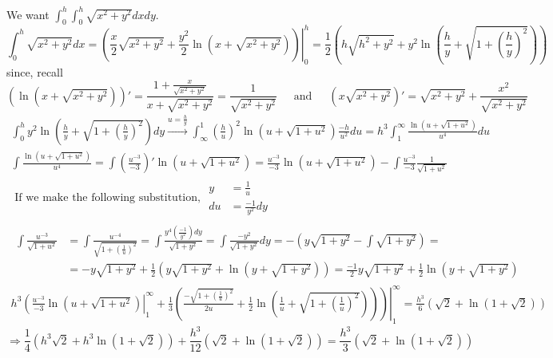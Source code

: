 \documentclass[twoside]{amsart}
\theoremstyle{plain}
\theoremstyle{definition}
\newcommand{\exercisehead}[1]
  {
   \noindent{\small\bf Exercise #1.}
   \smallskip}
\begin{document}
\exercisehead{19}  We want $\int_0^h \int_0^h \sqrt{ x^2 + y^2} dx dy$.  
\[
\int_0^h \sqrt{ x^2 + y^2} dx = \left. \left( \frac{x}{2} \sqrt{ x^2  +y^2} + \frac{y^2}{2} \ln{ (x+ \sqrt{ x^2 +y^2 } )}\right) \right|_0^h = \frac{1}{2} \left( h \sqrt{ h^2 +y^2} + y^2 \ln{( \frac{h}{y} + \sqrt{ 1 + \left( \frac{ h}{y} \right)^2 } )} \right)
\]
since, recall
\[
(\ln{ (x + \sqrt{ x^2 + y^2} )})' = \frac{ 1 + \frac{ x }{\sqrt{ x^2 + y^2}} }{ x + \sqrt{ x^2  +y^2} } = \frac{1}{\sqrt{ x^2 + y^2} } \quad \, \text{ and } \quad \, (x\sqrt{ x^2  +y^2} )' = \sqrt{ x^2 + y^2} + \frac{ x^2}{ \sqrt{ x^2 + y^2}}
\]
\[
\begin{gathered}
  \int_0^h y^2 \ln{ \left( \frac{h}{y} + \sqrt{ 1 + \left( \frac{h}{y} \right)^2 } \right) } dy \xrightarrow{ u = \frac{h}{y} } \int_{\infty}^1 \left( \frac{h}{u} \right)^2 \ln{ (u + \sqrt{ 1 + u^2} )} \frac{-h}{u^2} du = h^3 \int_1^{\infty} \frac{ \ln{ ( u + \sqrt{ 1 + u^2} )}}{u^4} du 
\end{gathered}
\]
\[
\begin{gathered}
  \int \frac{ \ln{ (u + \sqrt{ 1 + u^2})}}{ u^4} = \int \left( \frac{u^{-3}}{-3} \right)' \ln{(u+ \sqrt{ 1 + u^2})} = \frac{u^{-3}}{-3} \ln{ ( u + \sqrt{ 1 + u^2})} - \int \frac{u^{-3}}{-3} \frac{1}{ \sqrt{ 1 + u^2} }
\end{gathered}
\]
\[
\begin{gathered}
  \text{ If we make the following substitution, } \begin{aligned} y & = \frac{1}{u} \\ du & = \frac{-1}{y^2} dy \end{aligned} \\
\begin{aligned}
  \int \frac{u^{-3}}{ \sqrt{ 1 + u^2 } } & = \int \frac{u^{-4}}{ \sqrt{ 1 + \left( \frac{1}{u} \right)^2} } = \int \frac{y^4 \left( \frac{-1}{y^2} \right) dy }{ \sqrt{ 1 + y^2 } } = \int \frac{-y^2}{ \sqrt{ 1 + y^2}} dy = - \left( y \sqrt{ 1 + y^2}  - \int \sqrt{ 1 + y^2 } \right) = \\
  & = -y \sqrt{ 1 + y^2} + \frac{1}{2} ( y \sqrt{ 1 + y^2} + \ln{ ( y + \sqrt{ 1 + y^2} ) } )  = \frac{-1}{2} y \sqrt{ 1 + y^2} + \frac{1}{2} \ln{ (y + \sqrt{ 1 + y^2} ) }
\end{aligned} \\
\left. h^3 \left( \frac{u^{-3}}{-3} \ln{ ( u + \sqrt{ 1 + u^2} ) } \right|_1^{\infty} + \left. \frac{1}{3} \left( \frac{ - \sqrt{ 1 + \left( \frac{1}{u} \right)^2} }{ 2u} + \frac{1}{2} \ln{ \left( \frac{1}{u} + \sqrt{ 1 + \left( \frac{1}{u} \right)^2} \right) } \right) \right) \right|_1^{\infty} = \frac{h^3}{6} ( \sqrt{ 2} + \ln{ (1+ \sqrt{2})} )
\end{gathered}
\]
\[
\Longrightarrow \frac{1}{4} ( h^3 \sqrt{2} + h^3 \ln{ (1+\sqrt{2})}) + \frac{h^3}{12} (\sqrt{2} + \ln{(1+\sqrt{2})} ) = \boxed{ \frac{h^3}{3} (\sqrt{2} + \ln{(1+\sqrt{2})} ) }
\]
\end{document}
